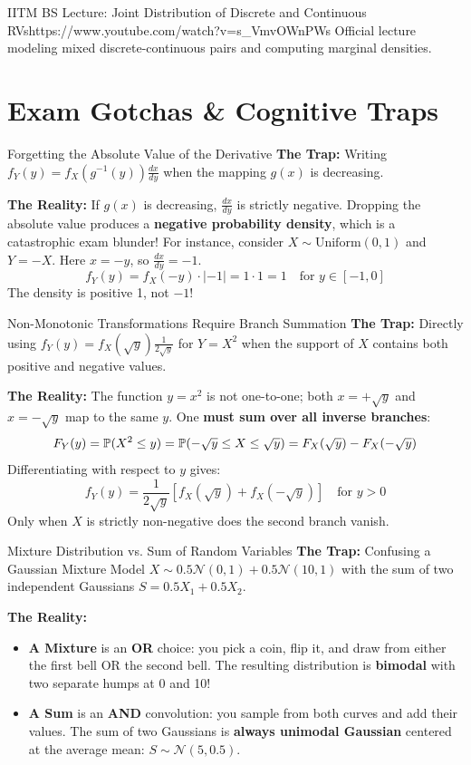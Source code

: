 \begin{videocard}{IITM BS Lecture: Joint Distribution of Discrete and Continuous RVs}{https://www.youtube.com/watch?v=s_VmvOWnPWs}
Official lecture modeling mixed discrete-continuous pairs and computing marginal densities.
\end{videocard}

\section{Exam Gotchas \& Cognitive Traps}

\begin{trapbox}{Forgetting the Absolute Value of the Derivative}
\textbf{The Trap:} Writing $f_Y(y) = f_X(g^{-1}(y)) \frac{dx}{dy}$ when the mapping $g(x)$ is decreasing.

\textbf{The Reality:} If $g(x)$ is decreasing, $\frac{dx}{dy}$ is strictly negative. Dropping the absolute value produces a \textbf{negative probability density}, which is a catastrophic exam blunder!
For instance, consider $X \sim \text{Uniform}(0, 1)$ and $Y = -X$. Here $x = -y$, so $\frac{dx}{dy} = -1$.
$$f_Y(y) = f_X(-y) \cdot |-1| = 1 \cdot 1 = 1 \quad \text{for } y \in [-1, 0]$$
The density is positive 1, not $-1$!
\end{trapbox}

\begin{trapbox}{Non-Monotonic Transformations Require Branch Summation}
\textbf{The Trap:} Directly using $f_Y(y) = f_X(\sqrt{y})\frac{1}{2\sqrt{y}}$ for $Y = X^2$ when the support of $X$ contains both positive and negative values.

\textbf{The Reality:} The function $y = x^2$ is not one-to-one; both $x = +\sqrt{y}$ and $x = -\sqrt{y}$ map to the same $y$. One \textbf{must sum over all inverse branches}:
$$F_Y(y) = \P(X^2 \le y) = \P(-\sqrt{y} \le X \le \sqrt{y}) = F_X(\sqrt{y}) - F_X(-\sqrt{y})$$
Differentiating with respect to $y$ gives:
$$f_Y(y) = \frac{1}{2\sqrt{y}} \left[ f_X(\sqrt{y}) + f_X(-\sqrt{y}) \right] \quad \text{for } y > 0$$
Only when $X$ is strictly non-negative does the second branch vanish.
\end{trapbox}

\begin{trapbox}{Mixture Distribution vs. Sum of Random Variables}
\textbf{The Trap:} Confusing a Gaussian Mixture Model $X \sim 0.5 \mathcal{N}(0, 1) + 0.5 \mathcal{N}(10, 1)$ with the sum of two independent Gaussians $S = 0.5 X_1 + 0.5 X_2$.

\textbf{The Reality:}
\begin{itemize}
    \item \textbf{A Mixture} is an \textbf{OR} choice: you pick a coin, flip it, and draw from either the first bell OR the second bell. The resulting distribution is \textbf{bimodal} with two separate humps at 0 and 10!
    \item \textbf{A Sum} is an \textbf{AND} convolution: you sample from both curves and add their values. The sum of two Gaussians is \textbf{always unimodal Gaussian} centered at the average mean: $S \sim \mathcal{N}(5, 0.5)$.
\end{itemize}
\end{trapbox}

